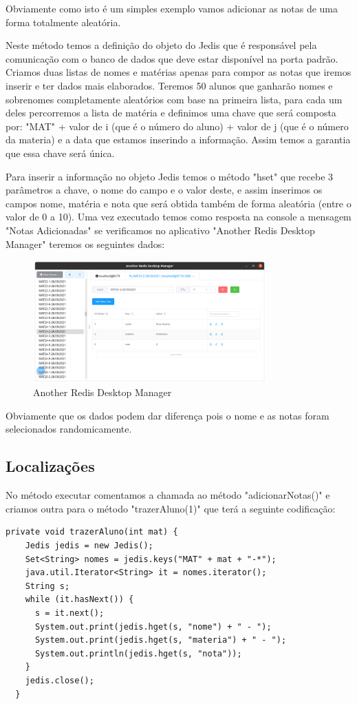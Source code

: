 Obviamente como isto é um simples exemplo vamos adicionar as notas de uma forma totalmente aleatória.

Neste método temos a definição do objeto do Jedis que é responsável pela comunicação com o banco de dados que deve estar disponível na porta padrão. Criamos duas listas de nomes e matérias apenas para compor as notas que iremos inserir e ter dados mais elaborados. Teremos 50 alunos que ganharão nomes e sobrenomes completamente aleatórios com base na primeira lista, para cada um deles percorremos a lista de matéria e definimos uma chave que será composta por: "MAT" + valor de i (que é o número do aluno) + valor de j (que é o número da materia) e a data que estamos inserindo a informação. Assim temos a garantia que essa chave será única.

Para inserir a informação no objeto Jedis temos o método "hset" que recebe 3 parâmetros a chave, o nome do campo e o valor deste, e assim inserimos os campos nome, matéria e nota que será obtida também de forma aleatória (entre o valor de 0 a 10). Uma vez executado temos como resposta na console a mensagem "Notas Adicionadas" se verificamos no aplicativo "Another Redis Desktop Manager" teremos os seguintes dados:
\begin{figure}[H]
	\centering
	\includegraphics[width=0.8\textwidth]{imagens/notasAlunos}
	\caption{Another Redis Desktop Manager}
\end{figure}

Obviamente que os dados podem dar diferença pois o nome e as notas foram selecionados randomicamente.

\subsection{Localizações}
No método executar comentamos a chamada ao método "adicionarNotas()" e criamos outra para o método "trazerAluno(1)" que terá a seguinte codificação:
\begin{lstlisting}[]
  private void trazerAluno(int mat) {
	Jedis jedis = new Jedis();
	Set<String> nomes = jedis.keys("MAT" + mat + "-*");
	java.util.Iterator<String> it = nomes.iterator();
	String s;
	while (it.hasNext()) {
      s = it.next();
      System.out.print(jedis.hget(s, "nome") + " - ");
      System.out.print(jedis.hget(s, "materia") + " - ");
      System.out.println(jedis.hget(s, "nota"));
	}
	jedis.close();
  }	
\end{lstlisting}

